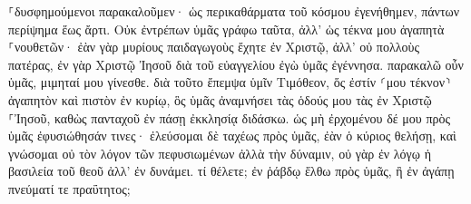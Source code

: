 \documentclass{openreader}
\begin{document}
⸀δυσφημούμενοι παρακαλοῦμεν· ὡς περικαθάρματα τοῦ κόσμου ἐγενήθημεν, πάντων περίψημα ἕως ἄρτι. 
Οὐκ ἐντρέπων ὑμᾶς γράφω ταῦτα, ἀλλ’ ὡς τέκνα μου ἀγαπητὰ ⸀νουθετῶν· 
ἐὰν γὰρ μυρίους παιδαγωγοὺς ἔχητε ἐν Χριστῷ, ἀλλ’ οὐ πολλοὺς πατέρας, ἐν γὰρ Χριστῷ Ἰησοῦ διὰ τοῦ εὐαγγελίου ἐγὼ ὑμᾶς ἐγέννησα. 
παρακαλῶ οὖν ὑμᾶς, μιμηταί μου γίνεσθε. 
διὰ τοῦτο ἔπεμψα ὑμῖν Τιμόθεον, ὅς ἐστίν ⸂μου τέκνον⸃ ἀγαπητὸν καὶ πιστὸν ἐν κυρίῳ, ὃς ὑμᾶς ἀναμνήσει τὰς ὁδούς μου τὰς ἐν Χριστῷ ⸀Ἰησοῦ, καθὼς πανταχοῦ ἐν πάσῃ ἐκκλησίᾳ διδάσκω. 
ὡς μὴ ἐρχομένου δέ μου πρὸς ὑμᾶς ἐφυσιώθησάν τινες· 
ἐλεύσομαι δὲ ταχέως πρὸς ὑμᾶς, ἐὰν ὁ κύριος θελήσῃ, καὶ γνώσομαι οὐ τὸν λόγον τῶν πεφυσιωμένων ἀλλὰ τὴν δύναμιν, 
οὐ γὰρ ἐν λόγῳ ἡ βασιλεία τοῦ θεοῦ ἀλλ’ ἐν δυνάμει. 
τί θέλετε; ἐν ῥάβδῳ ἔλθω πρὸς ὑμᾶς, ἢ ἐν ἀγάπῃ πνεύματί τε πραΰτητος; 
\end{document}
